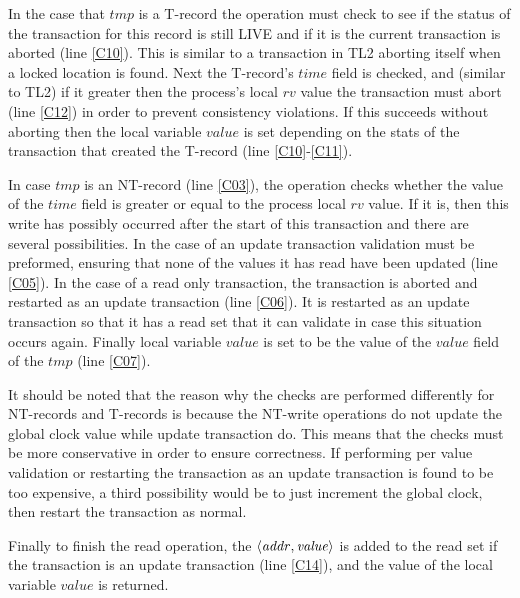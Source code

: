 In the case that $\mathit{tmp}$ is a T-record the operation must check to see
if the status of the transaction for this record is still LIVE and if it is
the current transaction is aborted (line \ref{C10}).
This is similar to a transaction in TL2 aborting itself when a locked location is found.
Next the T-record's $\mathit{time}$ field is checked, and (similar to TL2) if it 
greater then the process's local $\mathit{rv}$ value the transaction must abort 
(line \ref{C12}) in order to prevent consistency violations.
If this succeeds without aborting then the local variable $\mathit{value}$
is set depending on the stats of the transaction that created the T-record (line \ref{C10}-\ref{C11}).

In case $\mathit{tmp}$ is an 
NT-record (line \ref{C03}), the operation
checks whether the value of the $\mathit{time}$ field is
greater or equal to the process local $\mathit{rv}$ value.
If it is, then this write has possibly occurred after the start of this
transaction and there are several possibilities.
In the case of an update transaction validation must be preformed, ensuring
that none of the values it has read have been updated (line \ref{C05}).
In the case of a read only transaction, the transaction
is aborted and restarted as an update transaction (line \ref{C06}).
It is restarted as an update transaction so that it has a read set that it can validate
in case this situation occurs again.
Finally local variable $\mathit{value}$ is set to be the value
of the $\mathit{value}$ field of the $\mathit{tmp}$ (line \ref{C07}).

It should be noted that the reason why the checks are performed differently
for NT-records and T-records is because the NT-write operations do not
update the global clock value while update transaction do.
This means that the checks must be more conservative in order to ensure correctness.
If performing per value validation or restarting the transaction as an update transaction
is found to be too expensive, a third possibility would be to just increment the global
clock, then restart the transaction as normal.

Finally to finish the read operation, the $\left \langle \mathit{addr, value} \right \rangle $
is added to the read set if the transaction is an update transaction (line \ref{C14}),
and the value of the local variable $\mathit{value}$  is returned.







